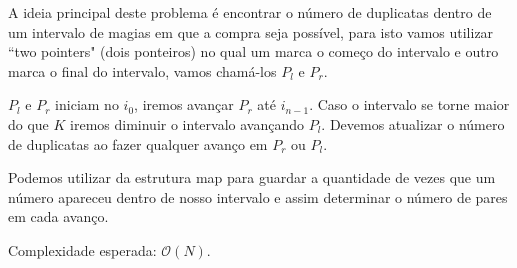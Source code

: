 A ideia principal deste problema é encontrar o número de duplicatas dentro de um intervalo de magias em que a compra seja possível, para isto vamos utilizar ``two pointers" (dois ponteiros) no qual um marca o começo do intervalo e outro marca o final do intervalo, vamos chamá-los $P_l$ e $P_r$.

$P_l$ e $P_r$ iniciam no $i_0$, iremos avançar $P_r$ até $i_{n-1}$. Caso o intervalo se torne maior do que $K$ iremos diminuir o intervalo avançando $P_l$. Devemos atualizar o número de duplicatas ao fazer qualquer avanço em $P_r$ ou $P_l$.

Podemos utilizar da estrutura map para guardar a quantidade de vezes que um número apareceu dentro de nosso intervalo e assim determinar o número de pares em cada avanço.

Complexidade esperada: $\mathcal{O}(N)$.
